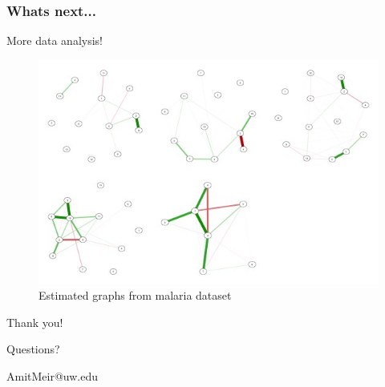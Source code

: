 \documentclass{beamer}
\theoremstyle{definition}
\begin{document}

\begin{frame}
\frametitle{Whats next...}
More data analysis!
\begin{figure}[]
\includegraphics[width=10 cm]{figures/malariaGraphs} \caption{Estimated graphs from malaria dataset}
\end{figure}
\end{frame}


\begin{frame}
\begin{center}
\huge{Thank you!}

\vspace{2 cm}
\LARGE{Questions?}

\vspace{1cm}
\large{AmitMeir@uw.edu}
\end{center}
\end{frame}
\end{document}
